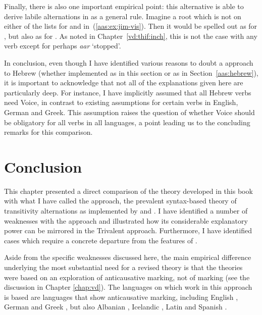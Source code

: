 \begin{exe}
\begin{xlist}
\begin{exe}
\begin{exe}
\begin{xlist}
\begin{exe}
\begin{exe}
\begin{exe}
\begin{exe}
\begin{exe}
\begin{xlist}
\begin{exe}
\begin{exe}
\begin{xlist}
\begin{exe}
\begin{xlist}
\begin{exe}
\begin{xlist}
\begin{exe}
\begin{xlist}
Finally, there is also one important empirical point: this alternative is able to derive labile alternations in {\tkal} as a general rule. Imagine a root  which is not on either of the lists for {\vds} and {\vzs} in~(\ref{aas:ex:jim-vis}). Then it would be spelled out as {\tkal} for {\vds}, but also as {\tkal} for {\vzs}. As noted in Chapter~\ref{vd:thif:inch}, this is not the case with any verb except for perhaps \emph{a{\ts}ar} `stopped'.

In conclusion, even though I have identified various reasons to doubt a  approach to Hebrew (whether implemented as in this section or as in Section~\ref{aas:hebrew}), it is important to acknowledge that not all of the explanations given here are particularly deep. For instance, I have implicitly assumed that all Hebrew verbs need Voice, in contrast to existing assumptions for certain verbs in English, German and Greek. This assumption raises the question of whether Voice should be obligatory for all verbs in all languages, a point leading us to the concluding remarks for this comparison.


\section{Conclusion} \label{aas:conc}
This chapter presented a direct comparison of the theory developed in this book with what I have called the  approach, the prevalent syntax-based theory of transitivity alternations as implemented by \cite{schaefer08,schaefer17oup} and \cite{layering15}. I have identified a number of weaknesses with the  approach and illustrated how its considerable explanatory power can be mirrored in the Trivalent approach. Furthermore, I have identified cases which require a concrete departure from the features of .

Aside from the specific weaknesses discussed here, the main empirical difference underlying the most substantial need for a revised theory is that the  theories were based on an exploration of anticausative marking, not of  marking (see the discussion in Chapter \ref{chap:vd}). The languages on which work in this approach is based are languages that show anticausative marking, including English \citep{myler16mit}, German \citep{schaefer17oup} and Greek \citep{spathasetal15}, but also Albanian \citep{kallulli13}, Icelandic \citep{wood15springer}, Latin \citep{embick04,kastnerzu17} and Spanish \citep{schaefervivanco16}.


\end{xlist}
\end{exe}
\end{xlist}
\end{exe}
\end{xlist}
\end{exe}
\end{xlist}
\end{exe}
\end{exe}
\end{xlist}
\end{exe}
\end{exe}
\end{exe}
\end{exe}
\end{exe}
\end{xlist}
\end{exe}
\end{exe}
\end{xlist}
\end{exe}
